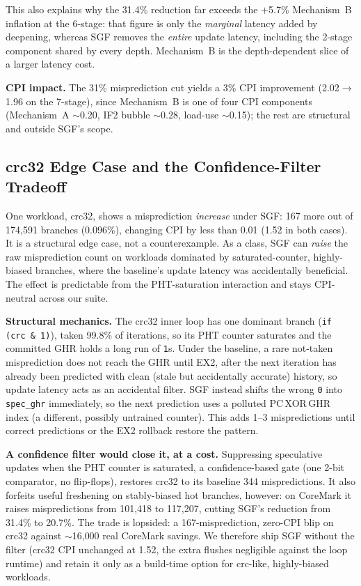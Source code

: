 \documentclass[acmsmall,nonacm,screen]{acmart}
\begin{document}
This also explains why the 31.4\% reduction far exceeds the $+$5.7\% Mechanism~B inflation at the 6-stage: that figure is only the \emph{marginal} latency added by deepening, whereas SGF removes the \emph{entire} update latency, including the 2-stage component shared by every depth. Mechanism~B is the depth-dependent slice of a larger latency cost.

\textbf{CPI impact.}
The 31\% misprediction cut yields a 3\% CPI improvement (2.02$\to$1.96 on the 7-stage), since Mechanism~B is one of four CPI components (Mechanism~A $\sim$0.20, IF2 bubble $\sim$0.28, load-use $\sim$0.15); the rest are structural and outside SGF's scope.

\subsection{crc32 Edge Case and the Confidence-Filter Tradeoff}
\label{sec:crc32}

One workload, crc32, shows a misprediction \emph{increase} under SGF: 167 more out of 174{,}591 branches (0.096\%), changing CPI by less than 0.01 (1.52 in both cases). It is a structural edge case, not a counterexample. As a class, SGF can \emph{raise} the raw misprediction count on workloads dominated by saturated-counter, highly-biased branches, where the baseline's update latency was accidentally beneficial. The effect is predictable from the PHT-saturation interaction and stays CPI-neutral across our suite.

\textbf{Structural mechanics.} The crc32 inner loop has one dominant branch (\texttt{if (crc \& 1)}), taken 99.8\% of iterations, so its PHT counter saturates and the committed GHR holds a long run of \texttt{1}s.
Under the baseline, a rare not-taken misprediction does not reach the GHR until EX2, after the next iteration has already been predicted with clean (stale but accidentally accurate) history, so update latency acts as an accidental filter.
SGF instead shifts the wrong \texttt{0} into \texttt{spec\_ghr} immediately, so the next prediction uses a polluted PC\,XOR\,GHR index (a different, possibly untrained counter). This adds 1--3 mispredictions until correct predictions or the EX2 rollback restore the pattern.

\textbf{A confidence filter would close it, at a cost.}
Suppressing speculative updates when the PHT counter is saturated, a confidence-based gate \cite{jacobsen1996assigning} (one 2-bit comparator, no flip-flops), restores crc32 to its baseline 344 mispredictions. It also forfeits useful freshening on stably-biased hot branches, however: on CoreMark it raises mispredictions from 101{,}418 to 117{,}207, cutting SGF's reduction from 31.4\% to 20.7\%.
The trade is lopsided: a 167-misprediction, zero-CPI blip on crc32 against $\sim$16{,}000 real CoreMark savings. We therefore ship SGF without the filter (crc32 CPI unchanged at 1.52, the extra flushes negligible against the loop runtime) and retain it only as a build-time option for crc-like, highly-biased workloads.
\end{document}

